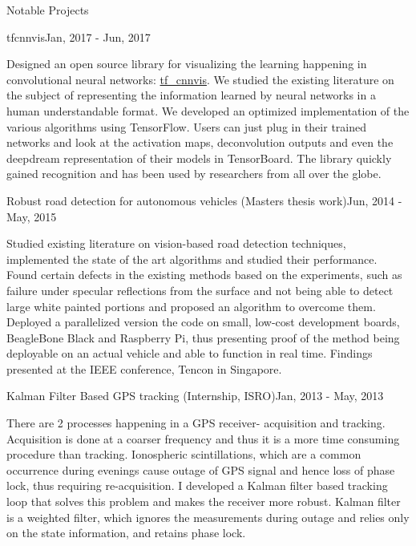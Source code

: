 \documentclass{resume} %
\begin{document}
	\vspace{0.3 in}
		\begin{rSection}{Notable Projects}
			
			\begin{rSubsection}{tfcnnvis}{Jan, 2017 - Jun, 2017}{}{}{}
				\item Designed an open source library for visualizing the learning happening in convolutional neural networks: \href{https://github.com/InFoCusp/tf_cnnvis}{tf\_cnnvis}. We studied the existing literature on the subject of representing the information learned by neural networks in a human understandable format. We developed an optimized implementation of the various algorithms using TensorFlow. Users can just plug in their trained networks and look at the activation maps, deconvolution outputs and even the deepdream representation of their models in TensorBoard. The library quickly gained recognition and has been used by researchers from all over the globe. 
			\end{rSubsection}
			\vspace{0.1 in}
			\begin{rSubsection}{Robust road detection for autonomous vehicles (Masters thesis work)}{Jun, 2014 - May, 2015}{}{}	{}
				\item Studied existing literature on vision-based road detection techniques, implemented the state of the art algorithms and studied their performance. Found certain defects in the existing methods based on the experiments, such as failure under specular reflections from the surface and not being able to detect large white painted portions and proposed an algorithm to overcome them. \\
				Deployed a parallelized version the code on small, low-cost development boards, BeagleBone Black and Raspberry Pi, thus presenting proof of the method being deployable on an actual vehicle and able to function in real time. Findings presented at the IEEE conference, Tencon in Singapore.
			\end{rSubsection}
			\vspace{0.1 in}
			\begin{rSubsection}{Kalman Filter Based GPS tracking  (Internship, ISRO)}{Jan, 2013 - May, 2013}{}{}	{}
			\item There are 2 processes happening in a GPS receiver- acquisition and tracking. Acquisition is done at a coarser frequency and thus it is a more time consuming procedure than tracking. Ionospheric scintillations, which are a common occurrence during evenings cause outage of GPS signal and hence loss of phase lock, thus requiring re-acquisition. I developed a Kalman filter based tracking loop that solves this problem and makes the receiver more robust. Kalman filter is a weighted filter, which ignores the measurements during outage and relies only on the state information, and retains phase lock. 
			\end{rSubsection}
			\vspace{0.1 in}
			

\end{rSection}
\end{document}
